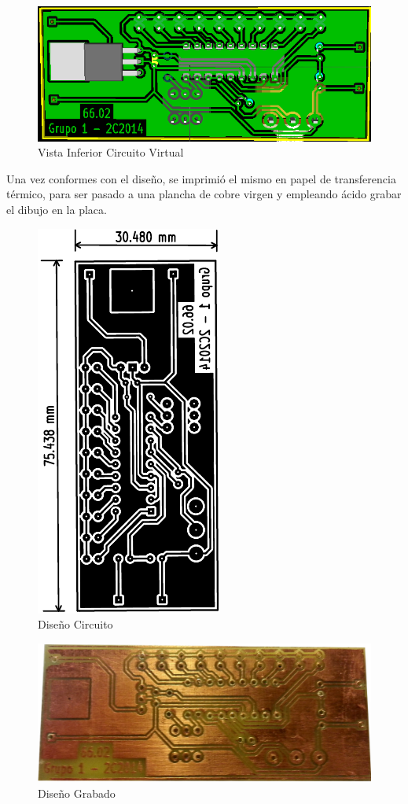 \documentclass[12pt,a4paper]{article}
\begin{document}
			\begin{figure}[H]
			\centering
				\includegraphics[scale=0.4]{images/virt_inf.png}\caption{Vista Inferior Circuito Virtual}
			\end{figure}

			Una vez conformes con el diseño, se imprimió el mismo en papel de transferencia térmico, para ser pasado a una plancha de cobre virgen y empleando ácido grabar el dibujo en la placa.

			\begin{figure}[H]
			\centering
				\includegraphics[scale=1,angle=-90]{images/design.pdf}\caption{Diseño Circuito}
			\end{figure}

			\begin{figure}[H]
			\centering
				\includegraphics[scale=0.25]{images/placa_grabada.jpg}\caption{Diseño Grabado}
			\end{figure}
\end{document}
